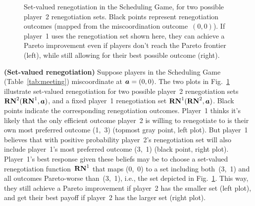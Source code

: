 \documentclass[sigconf]{aamas}
\theoremstyle{definition}
\begin{document}
\begin{figure}
\begin{tabular}{cc}
\\
    \end{tabular}
    \caption{
    Set-valued
    renegotiation in the Scheduling Game,
    for two possible player~2 renegotiation sets.
    Black points represent renegotiation outcomes
    (mapped from the miscoordination
    outcome~$(0,0)$).
    If player~1 uses the renegotiation set
    shown here,
    they can achieve a Pareto improvement
    even if players don't reach the Pareto frontier (left),
    while still allowing for their
    best possible outcome (right).
    }
    \label{fig:pmm}
\end{figure}




\begin{exmp}
\label{ex:svr}
\textbf{(Set-valued renegotiation)}
Suppose players in 
the Scheduling Game (Table~\ref{tab:meeting})
miscoordinate at $\boldsymbol{a}= (0,0)$.
The two plots in Fig.~\ref{fig:pmm} 
illustrate set-valued renegotiation
for
two possible player~2 renegotiation
sets
$\mathbf{RN}^{2}(\mathbf{RN}^{1}, \boldsymbol{a})$,
and a fixed player~1
renegotiation
set
$\mathbf{RN}^{1}(\mathbf{RN}^{2}, \boldsymbol{a})$.
Black points indicate the corresponding renegotiation
outcomes.
Player~1 thinks it's likely that
the only efficient outcome
player~2 is willing to renegotiate to 
is their own most
preferred outcome (1,~3)
(topmost gray point, left
plot).
But player~1 believes
that
with positive probability
player~2's renegotiation set 
will also
include
player~1's most preferred outcome (3,~1)
(black point, right plot).
Player~1's best response given these
beliefs may be to choose a 
set-valued
renegotiation function~$\mathbf{RN}^{1}$
that
maps (0,~0)
to a set
including both~(3,~1) and all outcomes
Pareto-worse
than~(3,~1),
i.e., the set depicted in Fig.~\ref{fig:pmm}.
This way, they
still achieve a Pareto improvement
if
player~2 has the smaller set (left plot),
and get their best payoff
if player~2 has the larger set (right plot).
\end{exmp}
\end{document}
